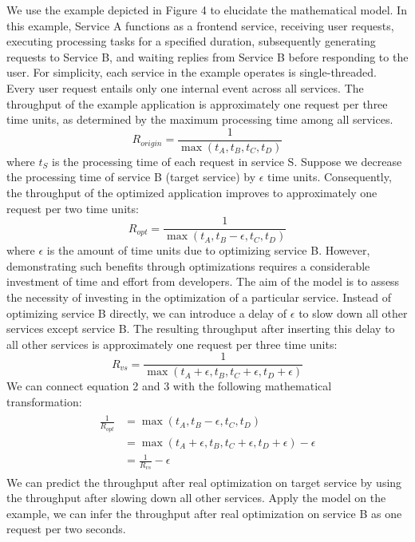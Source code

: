 We use the example depicted in Figure 4 to elucidate the mathematical model. 
In this example, Service A functions as a frontend service, receiving user requests, executing processing tasks for a specified duration, subsequently generating requests to Service B, and waiting replies from Service B before responding to the user.
For simplicity, each service in the example operates is single-threaded. Every user request entails only one internal event across all services.
The throughput of the example application is approximately one request per three time units, as determined by the maximum processing time among all services.
\begin{equation}
    \label{eq:r_origin}
    R_{origin} = \frac{1}{\max(t_A, t_B, t_C, t_D)}
\end{equation}
where $t_S$ is the processing time of each request in service S. Suppose we decrease the processing time of service B (target service) by $\epsilon$ time units. 
Consequently, the throughput of the optimized application improves to approximately one request per two time units:
\begin{equation}
    \label{eq:r_opt}
    R_{opt} = \frac{1}{\max(t_A, t_B-\epsilon, t_C, t_D)}
\end{equation}
where $\epsilon$ is the amount of time units due to optimizing service B.
However, demonstrating such benefits through optimizations requires a considerable investment of time and effort from developers.
The aim of the model is to assess the necessity of investing in the optimization of a particular service.
Instead of optimizing service B directly, we can introduce a delay of $\epsilon$ to slow down all other services except service B. 
The resulting throughput after inserting this delay to all other services is approximately one request per three time units:
\begin{equation}
    \label{eq:r_vs}
    R_{vs} = \frac{1}{\max(t_A+\epsilon, t_B, t_C+\epsilon, t_D+\epsilon)}
\end{equation}
We can connect equation 2 and 3 with the following mathematical transformation:
\begin{gather}
\begin{aligned}
    \frac{1}{R_{opt}} &= \max(t_A, t_B-\epsilon, t_C, t_D) \\
    &= \max(t_A+\epsilon, t_B, t_C+\epsilon, t_D+\epsilon) - \epsilon \\ 
    &= \frac{1}{R_{vs}} - \epsilon
\end{aligned}
\end{gather}
We can predict the throughput after real optimization on target service by using the throughput after slowing down all other services. 
Apply the model on the example, we can infer the throughput after real optimization on service B as one request per two seconds.


